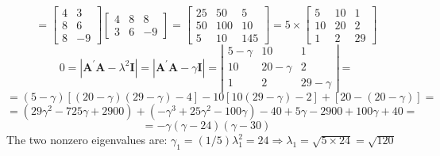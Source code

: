\begin{enumerate}[font=\bfseries]
\begin{enumerate}
\[                =
                \begin{bmatrix}
                    4 & 3 \\
                    8 & 6 \\
                    8 & -9
                \end{bmatrix}
                \begin{bmatrix}
                    4 & 8 & 8\\
                    3 & 6 & -9
                \end{bmatrix}
                =
                \begin{bmatrix}
                    25 & 50 & 5 \\
                    50 & 100 & 10 \\
                    5 & 10 & 145
                \end{bmatrix}
                =
                5 \times
                \begin{bmatrix}
                    5 & 10 & 1 \\
                    10 & 20 & 2 \\
                    1 & 2 & 29
                \end{bmatrix}
            \]
            \[
                0 = \left|\mathbf{A}^\prime\mathbf{A} - \lambda^2\mathbf{I}\right| = \left|\mathbf{A}^\prime\mathbf{A} - \gamma\mathbf{I}\right|
                =
                \left|
                \begin{matrix}
                    5-\gamma & 10 & 1 \\
                    10 & 20-\gamma & 2 \\
                    1 & 2 & 29-\gamma
                \end{matrix}
                \right|
                =
            \]
            \[
                =
                (5-\gamma)[(20-\gamma)(29-\gamma) - 4] - 10[10(29-\gamma) - 2] + [20 - (20-\gamma)]
                =
            \]
            \[
                =
                (29\gamma^2 - 725\gamma + 2900)+(-\gamma^3 + 25\gamma^2 - 100\gamma) - 40 + 5\gamma - 2900 + 100\gamma + 40
                =
            \]
            \[
                =
                -\gamma(\gamma - 24)(\gamma - 30)
            \]
            The two nonzero eigenvalues are:
            \newline
            $\gamma_1=(1/5)\lambda_1^2= 24 \Rightarrow \lambda_1 = \sqrt{5 \times 24} = \sqrt{120}$
            \newline

\end{enumerate}
\end{enumerate}
